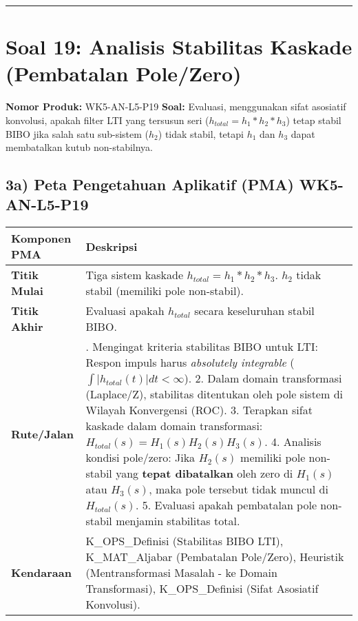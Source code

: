\documentclass[
  letterpaper,
  DIV=11,
  numbers=noendperiod]{scrreprt}
\begin{document}
\begin{center}\rule{0.5\linewidth}{0.5pt}\end{center}

\section{Soal 19: Analisis Stabilitas Kaskade (Pembatalan
Pole/Zero)}\label{soal-19-analisis-stabilitas-kaskade-pembatalan-polezero}

\textbf{Nomor Produk:} WK5-AN-L5-P19 \textbf{Soal:} Evaluasi,
menggunakan sifat asosiatif konvolusi, apakah filter LTI yang tersusun
seri (\(h_{total} = h_1 * h_2 * h_3\)) tetap stabil BIBO jika salah satu
sub-sistem (\(h_2\)) tidak stabil, tetapi \(h_1\) dan \(h_3\) dapat
membatalkan kutub non-stabilnya.

\subsection{3a) Peta Pengetahuan Aplikatif (PMA)
WK5-AN-L5-P19}\label{a-peta-pengetahuan-aplikatif-pma-wk5-an-l5-p19}

\begin{longtable}[]{@{}
  >{\raggedright\arraybackslash}p{}
  >{\raggedright\arraybackslash}p{}@{}}
\toprule\noalign{}
\begin{minipage}[b]{\linewidth}\raggedright
Komponen PMA
\end{minipage} & \begin{minipage}[b]{\linewidth}\raggedright
Deskripsi
\end{minipage} \\
\midrule\noalign{}
\endhead
\bottomrule\noalign{}
\endlastfoot
\textbf{Titik Mulai} & Tiga sistem kaskade
\(h_{total} = h_1 * h_2 * h_3\). \(h_2\) tidak stabil (memiliki pole
non-stabil). \\
\textbf{Titik Akhir} & Evaluasi apakah \(h_{total}\) secara keseluruhan
stabil BIBO. \\
\textbf{Rute/Jalan} & 1. Mengingat kriteria stabilitas BIBO untuk LTI:
Respon impuls harus \emph{absolutely integrable}
(\(\int |h_{total}(t)| dt < \infty\)). 2. Dalam domain transformasi
(Laplace/Z), stabilitas ditentukan oleh pole sistem di Wilayah
Konvergensi (ROC). 3. Terapkan sifat kaskade dalam domain transformasi:
\(H_{total}(s) = H_1(s) H_2(s) H_3(s)\). 4. Analisis kondisi pole/zero:
Jika \(H_2(s)\) memiliki pole non-stabil yang \textbf{tepat dibatalkan}
oleh zero di \(H_1(s)\) atau \(H_3(s)\), maka pole tersebut tidak muncul
di \(H_{total}(s)\). 5. Evaluasi apakah pembatalan pole non-stabil
menjamin stabilitas total. \\
\textbf{Kendaraan} & K\_OPS\_Definisi (Stabilitas BIBO LTI),
K\_MAT\_Aljabar (Pembatalan Pole/Zero), Heuristik (Mentransformasi
Masalah - ke Domain Transformasi), K\_OPS\_Definisi (Sifat Asosiatif
Konvolusi). \\
\end{longtable}
\end{document}
